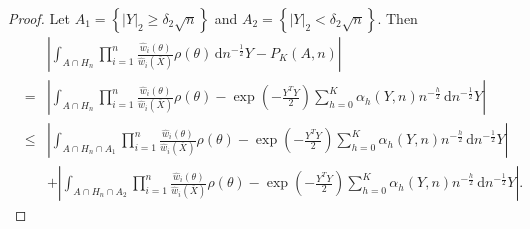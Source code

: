 \documentclass[oneside,english]{amsbook}
\numberwithin{section}{chapter}
\numberwithin{equation}{section}
\numberwithin{figure}{section}
\theoremstyle{plain}
\theoremstyle{plain}
\theoremstyle{definition}
\theoremstyle{plain}
\theoremstyle{plain}
\theoremstyle{remark}
\theoremstyle{definition}
\theoremstyle{definition}
\newcommand{\diff}{\,\mathrm{d}}
\begin{document}
\begin{proof}
Let $A_{1}=\left\{ \left|Y\right|_{2}\ge\delta_{2}\sqrt{n}\right\} $
and $A_{2}=\left\{ \left|Y\right|_{2}<\delta_{2}\sqrt{n}\right\} $.
Then 
\begin{eqnarray*}
 &  & \left|\int_{A\cap H_{n}}\prod_{i=1}^{n}\frac{\hat{w}_{i}\left(\theta\right)}{\hat{w}_{i}\left(\overline{X}\right)}\rho\left(\theta\right)\diff n^{-\frac{1}{2}}Y-P_{K}\left(A,n\right)\right|\\
 & = & \left|\int_{A\cap H_{n}}\prod_{i=1}^{n}\frac{\hat{w}_{i}\left(\theta\right)}{\hat{w}_{i}\left(\overline{X}\right)}\rho\left(\theta\right)-\exp\left(-\frac{Y^{T}Y}{2}\right)\sum_{h=0}^{K}\alpha_{h}\left(Y,n\right)n^{-\frac{h}{2}}\diff n^{-\frac{1}{2}}Y\right|\\
 & \le & \left|\int_{A\cap H_{n}\cap A_{1}}\prod_{i=1}^{n}\frac{\hat{w}_{i}\left(\theta\right)}{\hat{w}_{i}\left(\overline{X}\right)}\rho\left(\theta\right)-\exp\left(-\frac{Y^{T}Y}{2}\right)\sum_{h=0}^{K}\alpha_{h}\left(Y,n\right)n^{-\frac{h}{2}}\diff n^{-\frac{1}{2}}Y\right|\\
 &  & +\left|\int_{A\cap H_{n}\cap A_{2}}\prod_{i=1}^{n}\frac{\hat{w}_{i}\left(\theta\right)}{\hat{w}_{i}\left(\overline{X}\right)}\rho\left(\theta\right)-\exp\left(-\frac{Y^{T}Y}{2}\right)\sum_{h=0}^{K}\alpha_{h}\left(Y,n\right)n^{-\frac{h}{2}}\diff n^{-\frac{1}{2}}Y\right|.
\end{eqnarray*}



\end{proof}
\end{document}
